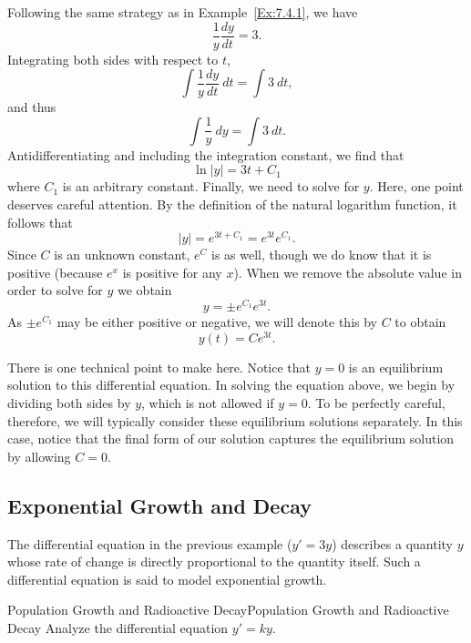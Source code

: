 \begin{solution}
Following the same strategy as in Example~\ref{Ex:7.4.1}, we have
$$  \frac 1y \frac{dy}{dt} = 3. $$
Integrating both sides with respect to $t$,
$$  \int \frac 1y\frac{dy}{dt}~dt = \int 3~dt,$$
and thus 
$$ \int \frac 1y~dy =  \int 3~dt.$$
Antidifferentiating and including the integration constant, we find that
$$  \ln|y| = 3t + C_1$$
where $ C_1 $ is an arbitrary constant. Finally, we need to solve for $y$.  Here, one point deserves careful
attention.  By the definition of the natural logarithm function, it follows that
$$
|y| = e^{3t+C_1} = e^{3t}e^{C_1}.
$$
Since $C$ is an unknown constant, $e^C$ is as well, though we do know
that it is positive (because $e^x$ is positive for any $x$).
When we remove the absolute value in order to solve for $y$ we obtain 
$$
y = \pm e^{C_1} e^{3t}.
$$
As $ \pm e^{C_1} $ may be either positive or
negative, we will denote this  by $C$ to obtain
$$
y(t) = Ce^{3t}.
$$

There is one technical point to make here.  Notice that $y=0$
is an equilibrium  solution to this differential equation.  In solving
the equation above, we begin by dividing both sides by $y$, which
is not allowed if $y=0$.  To be perfectly careful, therefore, we will typically
consider these equilibrium solutions separately.  In this case, notice that the final
form of our solution captures the equilibrium solution by allowing
$C=0$.
\end{solution}


\subsection{Exponential Growth and Decay}

The differential equation in the previous example ($ y'=3y $) describes a quantity $ y $ whose rate of change is directly proportional to the quantity itself. Such a differential equation is said to model exponential growth. 






\begin{example}{Population Growth and Radioactive Decay}{Population Growth and Radioactive Decay}\label{Population Growth and Radioactive Decay}
Analyze the differential equation $y'=ky$.
\end{example}

